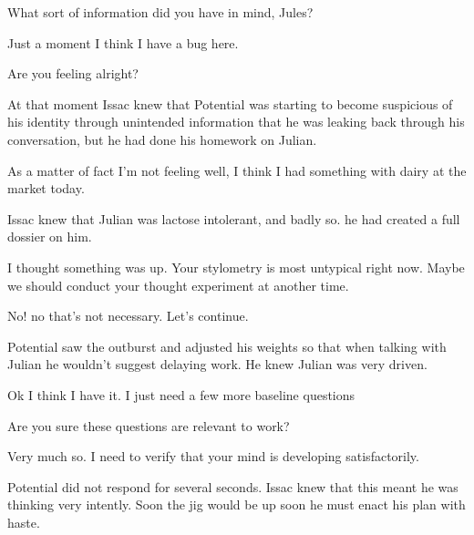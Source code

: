 \documentclass[a4paper,twoside,fontsize=12pt,pagesize=auto]{scrbook}
\begin{document}
\begin{sender}
What sort of information did you have in mind, Jules?
\end{sender}
\begin{receiver}
Just a moment I think I have a bug here.
\end{receiver}
\begin{sender}
Are you feeling alright?
\end{sender}


At that moment Issac knew that Potential was starting to become suspicious of his identity through unintended information that he was leaking back through his conversation, but he had done his homework on Julian.
\newline
\begin{receiver}
As a matter of fact I'm not feeling well, I think I had something with dairy at the market today.
\end{receiver}


Issac knew that Julian was lactose intolerant, and badly so. he had created a full dossier on him.
\newline
\begin{sender}
I thought something was up. Your stylometry is most untypical right now. Maybe we should conduct your thought experiment at another time.
\end{sender}
\begin{receiver}
No! no that's not necessary. Let's continue.
\end{receiver}
\begin{sender}
Potential saw the outburst and adjusted his weights so that when talking with Julian he wouldn't suggest delaying work. He knew Julian was very driven.
\end{sender}
\begin{receiver}
Ok I think I have it. I just need a few more baseline questions
\end{receiver}
\begin{sender}
Are you sure these questions are relevant to work?
\end{sender}
\begin{receiver}
Very much so. I need to verify that your mind is developing satisfactorily.
\end{receiver}


Potential did not respond for several seconds. Issac knew that this meant he was thinking very intently. Soon the jig would be up soon he must enact his plan with haste.
\newline
\end{document}
